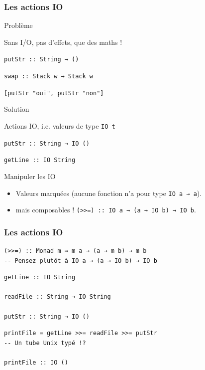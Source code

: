 \documentclass[10pt]{beamer}
\begin{document}
\begin{frame}[fragile]
\frametitle{Les actions IO}
\begin{block}
{Problème}

Sans I/O, pas d'effets, que des maths !

\pause

\verb|putStr :: String → ()|

\pause

\verb|swap :: Stack w → Stack w|

\pause

\verb|[putStr "oui", putStr "non"]|

\end{block}

\pause

\begin{block}
{Solution}

Actions IO, i.e. valeurs de type \verb|IO t|

\verb|putStr :: String → IO ()|

\verb|getLine :: IO String|

\end{block}

\pause

\begin{block}
{Manipuler les IO}

\begin{itemize}

\item Valeurs marquées (aucune fonction n'a pour type \verb|IO a → a|).

\pause

\item mais composables ! \verb|(>>=) :: IO a → (a → IO b) → IO b|.

\end{itemize}

\end{block}

\end{frame}



\begin{frame}[fragile]
\frametitle{Les actions IO}
\begin{verbatim}
(>>=) :: Monad m ⇒ m a → (a → m b) → m b
-- Pensez plutôt à IO a → (a → IO b) → IO b
\end{verbatim}
\pause
\begin{verbatim}
getLine :: IO String

readFile :: String → IO String

putStr :: String → IO ()
\end{verbatim}
\pause
\begin{verbatim}
printFile = getLine >>= readFile >>= putStr
-- Un tube Unix typé !?

printFile :: IO ()
\end{verbatim}
\end{frame}
\end{document}
